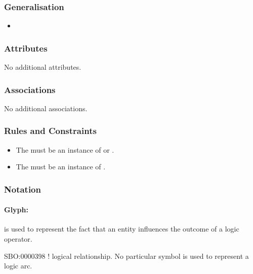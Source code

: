 \subsubsection{Generalisation}

\begin{itemize}
\item {}
\end{itemize}

\subsubsection{Attributes}

No additional attributes.

\subsubsection{Associations}

No additional associations.

\subsubsection{Rules and Constraints}

\begin{itemize}
\item The  must be an instance of
   or .
\item The  must be an instance of
  .
\end{itemize}

\subsubsection{Notation}

\paragraph{Glyph:  }\label{sec:logicArc}

 is used to represent the fact that an entity influences
the outcome of a logic operator. 

\begin{glyphDescription}
 \glyphSboTerm SBO:0000398 ! logical relationship.
 \glyphEndPoint No particular symbol is used to represent a logic arc.
 \end{glyphDescription}

